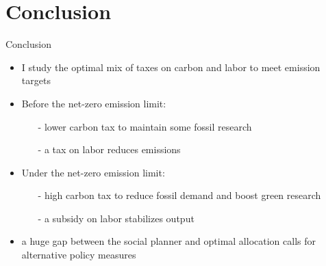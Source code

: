 \documentclass[11pt,aspectratio=169]{beamer}
\begin{document}
\section{Conclusion}
\begin{frame}{Conclusion}
	\begin{itemize}[<+-| alert@+>]
		\item I study the optimal mix of taxes on carbon and labor to meet emission targets
			\vspace{3mm}
		\item Before the net-zero emission limit: 
		\begin{itemize}
			\item[-] lower carbon tax to maintain some fossil research
			\item[-] a tax on labor reduces emissions
		\end{itemize}
		\vspace{3mm}
	\item Under the net-zero emission limit: 
	\begin{itemize}
		\item[-]  high carbon tax to reduce fossil demand and boost green research
		\item[-]  a subsidy on labor stabilizes output
	\end{itemize}
\item a huge gap between the social planner and optimal allocation calls for alternative policy measures
	\end{itemize}
\end{frame}


%
\end{document}
